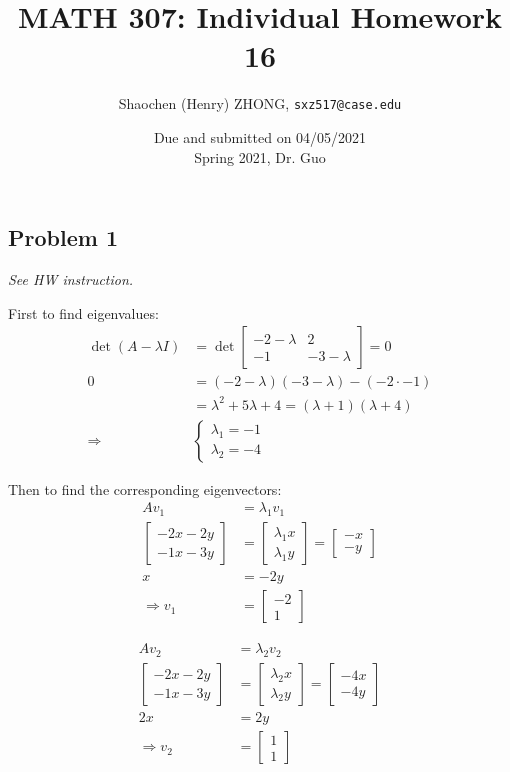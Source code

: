 \documentclass[11pt]{article}
\newcommand{\ilc}{\texttt}
\providecommand{\qbm}[1]{\begin{bmatrix} #1 \end{bmatrix}}
\begin{document}
\title{\textbf{MATH 307: Individual Homework 16}}


\author{Shaochen (Henry) ZHONG, \ilc{sxz517@case.edu}}

\date{Due and submitted on 04/05/2021 \\ Spring 2021, Dr. Guo}
\maketitle



\subsection*{Problem 1}
\textit{See HW instruction.}\newline

First to find eigenvalues:
\begin{align*}
    \det(A - \lambda I) &= \det\qbm{-2-\lambda & 2 \\ -1 & -3-\lambda} = 0 \\
    0 &= (-2-\lambda)(-3-\lambda) - (-2 \cdot -1)  \\
    &= \lambda^2 + 5\lambda + 4 = (\lambda + 1)(\lambda + 4) \\
    \Longrightarrow &\begin{cases}
        \lambda_1 = -1 \\
        \lambda_2 = -4
    \end{cases}
\end{align*}

Then to find the corresponding eigenvectors:
\begin{align*}
    Av_1 &= \lambda_1 v_1 \\
    \qbm{-2x - 2y \\ -1x -3y} &= \qbm{\lambda_1 x \\ \lambda_1 y} = \qbm{-x \\ -y} \\
    x &= -2y \\
    \Longrightarrow v_1 &= \qbm{-2 \\ 1}
\end{align*}

\begin{align*}
    Av_2 &= \lambda_2 v_2 \\
    \qbm{-2x - 2y \\ -1x -3y} &= \qbm{\lambda_2 x \\ \lambda_2 y} = \qbm{-4x \\ -4y} \\
    2x &= 2y \\
    \Longrightarrow v_2 &= \qbm{1 \\ 1}
\end{align*}
\end{document}
